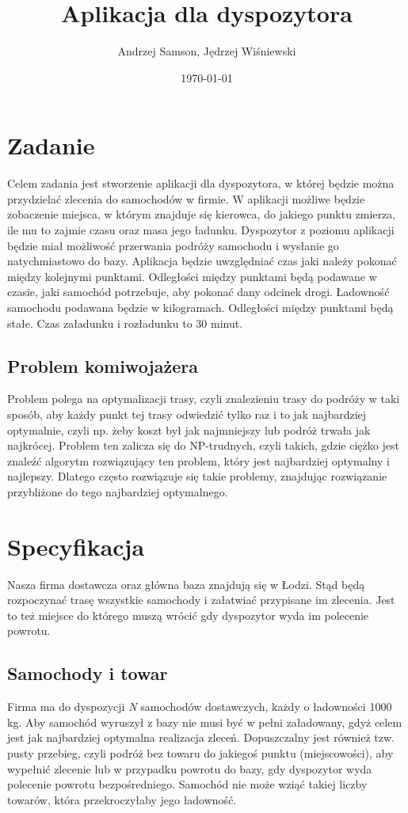 \documentclass[11pt,a4paper]{mwart}
\title{Aplikacja dla dyspozytora}
\author{Andrzej Samson, Jędrzej Wiśniewski}
\date{\today}
\begin{document}
\maketitle
\section{Zadanie} 
Celem zadania jest stworzenie aplikacji dla dyspozytora, w której będzie można przydzielać zlecenia do samochodów w firmie. W aplikacji możliwe będzie zobaczenie miejsca, w którym znajduje się kierowca, do jakiego punktu zmierza, ile mu to zajmie czasu oraz masa jego ładunku. Dyspozytor z poziomu aplikacji będzie miał możliwość przerwania podróży samochodu i wysłanie go natychmiastowo do bazy. Aplikacja będzie uwzględniać czas jaki należy pokonać między kolejnymi punktami. Odległości między punktami będą podawane w czasie, jaki samochód potrzebuje, aby pokonać dany odcinek drogi. Ładowność samochodu podawana będzie w kilogramach. Odległości między punktami będą stałe. Czas załadunku i rozładunku to 30 minut.
\subsection{Problem komiwojażera}
Problem polega na optymalizacji trasy, czyli znalezieniu trasy do podróży w taki sposób, aby każdy punkt tej trasy odwiedzić tylko raz i to jak najbardziej optymalnie, czyli np. żeby koszt był jak najmniejszy lub podróż trwała jak najkrócej. Problem ten zalicza się do NP-trudnych, czyli takich, gdzie ciężko jest znaleźć algorytm rozwiązujący ten problem, który jest najbardziej optymalny i najlepszy. Dlatego często rozwiązuje się takie problemy, znajdując rozwiązanie przybliżone do tego najbardziej optymalnego.
\section{Specyfikacja}
Nasza firma dostawcza oraz główna baza znajdują się w Łodzi. Stąd będą rozpoczynać trasę wszystkie samochody i załatwiać przypisane im zlecenia. Jest to też miejsce do którego muszą wrócić gdy dyspozytor wyda im polecenie powrotu. 
\subsection{Samochody i towar}
Firma ma do dyspozycji \textit{N} samochodów dostawczych, każdy o ładowności 1000 kg. Aby samochód wyruszył z bazy nie musi być w pełni załadowany, gdyż celem jest jak najbardziej optymalna realizacja zleceń. Dopuszczalny jest również tzw. pusty przebieg, czyli podróż bez towaru do jakiegoś punktu (miejscowości), aby wypełnić zlecenie lub w przypadku powrotu do bazy, gdy dyspozytor wyda polecenie powrotu bezpośredniego. Samochód nie może wziąć takiej liczby towarów, która przekroczyłaby jego ładowność. 
\end{document}

